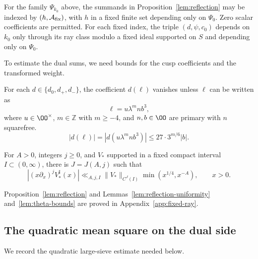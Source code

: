 \begin{lemma}\label{lem:reflection-uniformity}
For the family $\Psi_{k_0}$ above, the summands in
Proposition~\ref{lem:reflection} may be indexed by
$(h,\mathcal A_{\rm fix})$, with $h$ in a fixed finite set depending
only on $\Psi_0$. Zero scalar coefficients are permitted.
For each fixed index, the triple $(d,\psi,c_0)$ depends on $k_0$
only through its ray class modulo a fixed ideal supported on $S$
and depending only on $\Psi_0$.
\end{lemma}

To estimate the dual sums, we need bounds for the cusp coefficients
and the transformed weight.
\begin{lemma}\label{lem:theta-bounds}
For each $d\in\{d_0,d_+,d_-\}$, the coefficient $d(\ell)$
vanishes unless $\ell$ can be written as
\begin{equation}\label{eq:theta-support}
 \ell=u\lambda^mnb^3,
\end{equation}
where $u\in\OO^\times$, $m\in\mathbb Z$ with $m\ge-4$, and
$n,b\in\OO$ are primary with $n$ squarefree.
\begin{equation}\label{eq:theta-coefficient-bound}
 |d(\ell)|=|d(u\lambda^mnb^3)|\le27\cdot 3^{m/6}|b|.
\end{equation}

For $A>0$, integers $j\ge0$, and $V_*$ supported in a fixed compact
interval $I\subset(0,\infty)$, there is $J=J(A,j)$ such that
\begin{equation}\label{eq:theta-weight-decay}
 |(x\partial_x)^jV_*^\sharp(x)|
 \ll_{A,j,I}\|V_*\|_{C^J(I)}\min(x^{1/4},x^{-A}),\qquad x>0.
\end{equation}
\end{lemma}

Proposition~\ref{lem:reflection}
and Lemmas~\ref{lem:reflection-uniformity} and~\ref{lem:theta-bounds}
are proved in Appendix~\ref{app:fixed-ray}.

\subsection{The quadratic mean square on the dual side}
We record the quadratic large-sieve estimate needed below.

